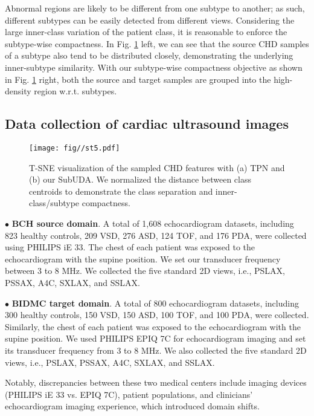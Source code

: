  
Abnormal regions are likely to be different from one subtype to another; as such, different subtypes can be easily detected from different views. Considering the large inner-class variation of the patient class, it is reasonable to enforce the subtype-wise compactness. In Fig. \ref{fig:55} left, we can see that the source CHD samples of a subtype also tend to be distributed closely, demonstrating the underlying inner-subtype similarity. With our subtype-wise compactness objective as shown in Fig. \ref{fig:55} right, both the source and target samples are grouped into the high-density region w.r.t. subtypes.
 
\subsection{Data collection of cardiac ultrasound images}

\begin{figure}[t]
\centering
\texttt{[image: fig//st5.pdf]}\\ 
\caption{T-SNE visualization of the sampled CHD features with (a) TPN \cite{pan2019transferrable} and (b) our SubUDA. We normalized the distance between class centroids to demonstrate the class separation and inner-class/subtype compactness.}\label{fig:55} 
\end{figure}

$\bullet$ \textbf{BCH source domain}. A total of 1,608 echocardiogram datasets, including 823 healthy controls, 209 VSD, 276 ASD, 124 TOF, and 176 PDA, were collected using PHILIPS iE 33. The chest of each patient was exposed to the echocardiogram with the supine position. We set our transducer frequency between 3 to 8 MHz. We collected the five standard 2D views, i.e., PSLAX, PSSAX, A4C, SXLAX, and SSLAX.
 
$\bullet$ \textbf{BIDMC target domain}. A total of 800 echocardiogram datasets, including 300 healthy controls, 150 VSD, 150 ASD, 100 TOF, and 100 PDA, were collected. Similarly, the chest of each patient was exposed to the echocardiogram with the supine position. We used PHILIPS EPIQ 7C for echocardiogram imaging and set its transducer frequency from 3 to 8 MHz. We also collected the five standard 2D views, i.e., PSLAX, PSSAX, A4C, SXLAX, and SSLAX.

Notably, discrepancies between these two medical centers include imaging devices (PHILIPS iE 33 vs. EPIQ 7C), patient populations, and clinicians' echocardiogram imaging experience, which introduced domain shifts.

